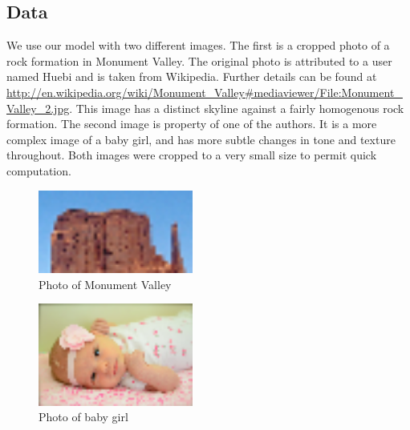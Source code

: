 \documentclass[12pt]{article}
\begin{document}
\subsection*{Data}
We use our model with two different images. The first is a cropped photo of a
rock formation in Monument Valley. The original photo is attributed to a user
named Huebi and is taken from Wikipedia. Further details can be found at
\url{http://en.wikipedia.org/wiki/Monument_Valley#mediaviewer/File:Monument_Valley_2.jpg}.
This image has a distinct skyline against a fairly homogenous rock formation.
The second image is property of one of the authors. It is a more complex image
of a baby girl, and has more subtle changes in tone and texture throughout.
Both images were cropped to a very small size to permit quick computation.

\begin{figure}
    \begin{center}
        \includegraphics[width=2in]{small/mv_small.png}
    \end{center}
    \caption{Photo of Monument Valley}
\end{figure}

\begin{figure}
    \begin{center}
        \includegraphics[width=2in]{small/esther_small.png}
    \end{center}
    \caption{Photo of baby girl}
\end{figure}
\end{document}
